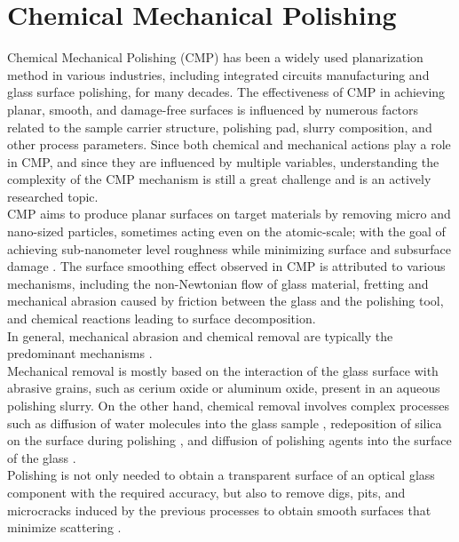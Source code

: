 \section{Chemical Mechanical Polishing}
\label{sec:CMP}
Chemical Mechanical Polishing (CMP) has been a widely used planarization method in various industries, including integrated circuits manufacturing and glass surface polishing, for many decades. The effectiveness of CMP in achieving planar, smooth, and damage-free surfaces is influenced by numerous factors related to the sample carrier structure, polishing pad, slurry composition, and other process parameters. Since both chemical and mechanical actions play a role in CMP, and since they are influenced by multiple variables, understanding the complexity of the CMP mechanism is still a great challenge and is an actively researched topic.
\\
CMP aims to produce planar surfaces on target materials by removing micro and nano-sized particles, sometimes acting even on the atomic-scale; with the goal of achieving sub-nanometer level roughness while minimizing surface and subsurface damage \cite{zhaoChemicalMechanicalPolishing2013}. The surface smoothing effect observed in CMP is attributed to various mechanisms, including the non-Newtonian flow of glass material, fretting and mechanical abrasion caused by friction between the glass and the polishing tool, and chemical reactions leading to surface decomposition.
\\
In general, mechanical abrasion and chemical removal are typically the predominant mechanisms \cite{gerhardQuantificationSurfaceContamination2021}.
\\
Mechanical removal is mostly based on the interaction of the glass surface with abrasive grains, such as cerium oxide or aluminum oxide, present in an aqueous polishing slurry. On the other hand, chemical removal involves complex processes such as diffusion of water molecules into the glass sample \cite{cookChemicalProcessesGlass1990}, redeposition of silica on the surface during polishing \cite{suratwalaChemistryFormationBeilby2015}, and diffusion of polishing agents into the surface of the glass \cite[165]{rathoreProceedingsSymposiumInterconnect1998}.
\\
Polishing is not only needed to obtain a transparent surface of an optical glass component with the required accuracy, but also to remove digs, pits, and microcracks induced by the previous processes to obtain smooth surfaces that minimize scattering \cite{gerhardOpticsManufacturingComponents2017}.

